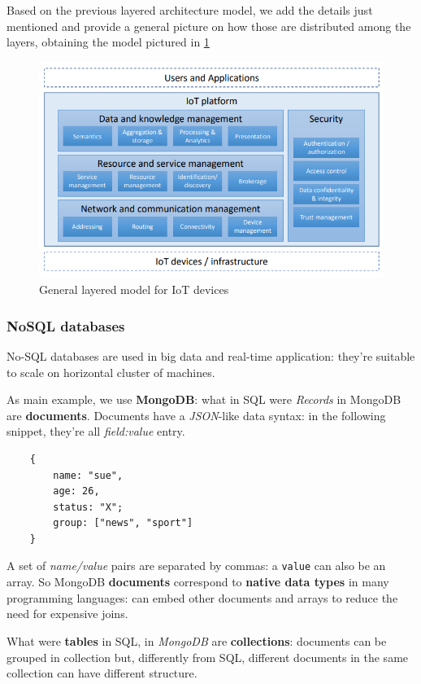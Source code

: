 \documentclass[10pt,a4paper]{report}
\theoremstyle{definition}
\begin{document}
Based on the previous layered architecture model, we add the details just mentioned and provide a general picture on how those are distributed among the layers, obtaining the model pictured in \ref{general-iot-platform}
\begin{figure}[h]
	\centering
	\includegraphics[scale=0.50]{images/Pasted image 20230221155442.png}
	\caption{General layered model for IoT devices}
	\label{general-iot-platform}
\end{figure}

\subsubsection{NoSQL databases}\label{sec:nosql-databases}
No-SQL databases are used in big data and real-time application: they're suitable to scale on horizontal cluster of machines.

As main example, we use \textbf{MongoDB}: what in SQL were \textit{Records} in MongoDB are \textbf{documents}. Documents have a \textit{JSON}-like data syntax: in the following snippet, they're all \textit{field:value} entry.
\begin{verbatim}
	{ 
		name: "sue", 
		age: 26, 
		status: "X"; 
		group: ["news", "sport"] 
	}
\end{verbatim}

A set of \textit{name/value} pairs are separated by commas: a \texttt{value} can also be an array.
So MongoDB \textbf{documents} correspond to \textbf{native data types} in many programming languages: can embed other documents and arrays to reduce the need for expensive joins.

What were \textbf{tables} in SQL, in \textit{MongoDB} are \textbf{collections}: documents can be grouped in collection but, differently from SQL, different documents in the same collection can have different structure.
\end{document}

